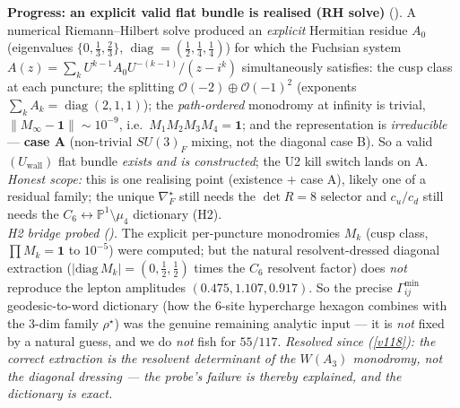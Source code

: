 \documentclass[11pt,a4paper]{article}
\newcommand{\PP}{\mathbb P^1}
\begin{document}
\par\smallskip\noindent\textbf{Progress: an explicit valid flat bundle is realised (RH solve)} (\mE).
A numerical Riemann--Hilbert solve produced an \emph{explicit} Hermitian residue $A_0$ (eigenvalues
$\{0,\tfrac13,\tfrac23\}$, $\operatorname{diag}=(\tfrac12,\tfrac14,\tfrac14)$) for which the Fuchsian system
$A(z)=\sum_kU^{k-1}A_0U^{-(k-1)}/(z-i^k)$ simultaneously satisfies: the cusp class at each puncture; the
splitting $\mathcal O(-2)\oplus\mathcal O(-1)^2$ (exponents $\sum_kA_k=\operatorname{diag}(2,1,1)$); the
\emph{path-ordered} monodromy at infinity is trivial, $\|M_\infty-\mathbf1\|\sim10^{-9}$, i.e.\
$M_1M_2M_3M_4=\mathbf1$; and the representation is \emph{irreducible} --- \textbf{case A} (non-trivial
$SU(3)_F$ mixing, not the diagonal case B). So a valid $(U_{\mathrm{wall}})$ flat bundle \emph{exists and is
constructed}; the U2 kill switch lands on A. \emph{Honest scope:} this is one realising point (existence
$+$ case A), likely one of a residual family; the unique $\nabla_F^\star$ still needs the $\det R=8$
selector and $c_u/c_d$ still needs the $C_6\leftrightarrow\PP\setminus\mu_4$ dictionary (H2).
\veri{v33\_explicit\_flat\_bundle.py}
\smallskip\\
\noindent\emph{H2 bridge probed ().} The explicit per-puncture
monodromies $M_k$ (cusp class, $\prod M_k=\mathbf1$ to $10^{-5}$) were computed; but the natural
resolvent-dressed diagonal extraction ($|\mathrm{diag}\,M_k|=(0,\tfrac12,\tfrac12)$ times the $C_6$
resolvent factor) does \emph{not} reproduce the lepton amplitudes $(0.475,1.107,0.917)$. So the precise
$\Gamma^{\min}_{ij}$ geodesic-to-word dictionary (how the $6$-site hypercharge hexagon combines with the
$3$-dim family $\rho^\star$) was the genuine remaining analytic input --- it is \emph{not} fixed by a
natural guess, and we do \emph{not} fish for $55/117$. \emph{Resolved since (\vref{v118}): the correct
extraction is the resolvent determinant of the $W(A_3)$ monodromy, not the diagonal dressing --- the
probe's failure is thereby explained, and the dictionary is exact.}
\end{document}
